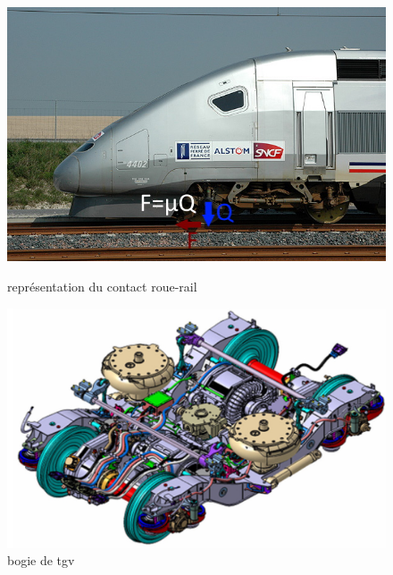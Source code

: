 \documentclass[12pt, a4paper, onecolumn]{article}
\begin{document}
\begin{figure}[H]
  \centering
  \begin{minipage}{0.5\textwidth}
    \includegraphics[width=\textwidth]
    {img/adherence.jpg}
    \caption{représentation du contact roue-rail}
    \label{adherence}
  \end{minipage}\hfill
  \begin{minipage}{0.5\textwidth}
    \includegraphics[width=\textwidth]
    {img/bogietrain.png}
    \caption{bogie de tgv}
    \label{bogietrain}
  \end{minipage}
\end{figure}



\pagebreak %
\end{document}
